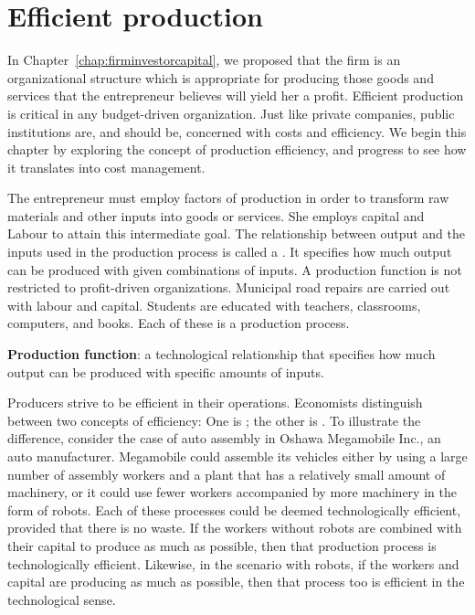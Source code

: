 \section{Efficient production}\label{sec:ch8sec1}

In Chapter~\ref{chap:firminvestorcapital}, we proposed that the firm is an organizational structure which is appropriate for producing those goods and services that the entrepreneur believes will yield her a profit. Efficient production is critical in any budget-driven organization. Just like private companies, public institutions are, and should be, concerned with costs and efficiency. We begin this chapter by exploring the concept of production efficiency, and progress to see how it translates into cost management.

The entrepreneur must employ factors of production in order to transform raw materials and other inputs into goods or services. She employs capital and Labour to attain this intermediate goal. The relationship between output and the inputs used in the production process is called a . It specifies how much output can be produced with given combinations of inputs. A production function is not restricted to profit-driven organizations. Municipal road repairs are carried out with labour and capital. Students are educated with teachers, classrooms, computers, and books. Each of these is a production process.

\begin{DefBox}
\textbf{Production function}: a technological relationship that specifies how much output can be produced with specific amounts of inputs.
\end{DefBox}

Producers strive to be efficient in their operations. Economists distinguish between two concepts of efficiency: One is ; the other is . To illustrate the difference, consider the case of auto assembly in Oshawa Megamobile Inc., an auto manufacturer. Megamobile could assemble its vehicles either by using a large number of assembly workers and a plant that has a relatively small amount of machinery, or it could use fewer workers accompanied by more machinery in the form of robots. Each of these processes could be deemed technologically efficient, provided that there is no waste. If the workers without robots are combined with their capital to produce as much as possible, then that production process is technologically efficient. Likewise, in the scenario with robots, if the workers and capital are producing as much as possible, then that process too is efficient in the technological sense.

